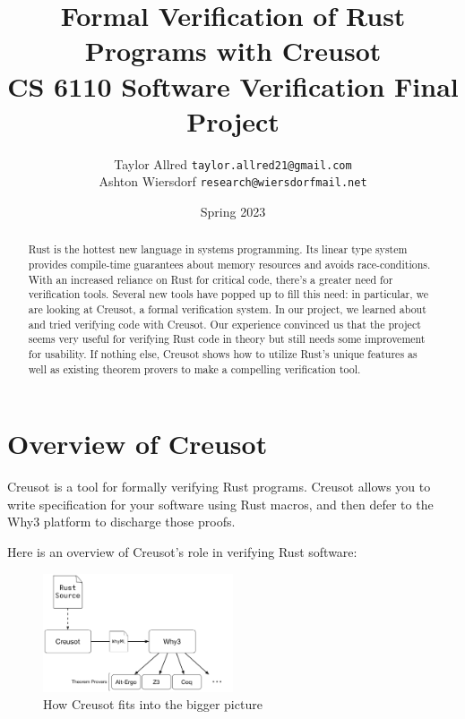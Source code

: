 \documentclass[12pt]{article}
\title{{Formal Verification of Rust Programs with Creusot}\\{\large CS 6110 Software Verification Final Project}}
\author{Taylor Allred \texttt{taylor.allred21@gmail.com}\\ Ashton Wiersdorf \texttt{research@wiersdorfmail.net}}
\date{Spring 2023}
\begin{document}
\maketitle

\begin{abstract}
\noindent
Rust is the hottest new language in systems programming.
Its linear type system provides compile-time guarantees about memory resources and avoids race-conditions.
With an increased reliance on Rust for critical code, there's a greater need for verification tools.
Several new tools have popped up to fill this need: in particular, we are looking at Creusot, a formal verification system.
In our project, we learned about and tried verifying code with Creusot.
Our experience convinced us that the project seems very useful for verifying Rust code in theory but still needs some improvement for usability.
If nothing else, Creusot shows how to utilize Rust's unique features as well as existing theorem provers to make a compelling verification tool.
\end{abstract}

\setcounter{tocdepth}{2}
\tableofcontents

\clearpage
\restoregeometry
{}
\section{Overview of Creusot}

Creusot\cite{denisCreusot2023} is a tool for formally verifying Rust programs.
Creusot allows you to write specification for your software using Rust macros, and then defer to the Why3\cite{bobotWhy3ShepherdYour} platform to discharge those proofs.

Here is an overview of Creusot's role in verifying Rust software:

\begin{figure}[h]
  \centering
\includegraphics[width=0.5\textwidth]{creusot_why3_diagram}
\caption{How Creusot fits into the bigger picture}
\end{figure}
\end{document}
